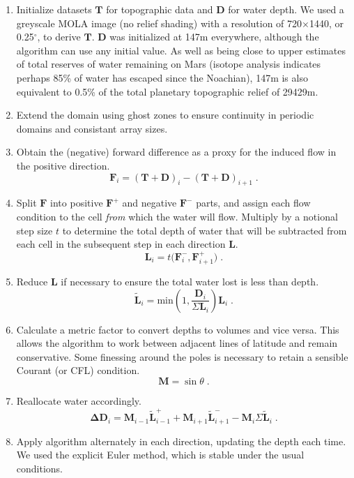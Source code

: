 \documentclass[12pt]{iopart}
\numberwithin{equation}{section}
\begin{document}
\begin{enumerate}
\item Initialize datasets $\mathbf{T}$ for topographic data and $\mathbf{D}$ for water depth. We used a greyscale MOLA image (no relief shading) with a resolution of 720$\times$1440, or 0.25$^\circ$, to derive $\mathbf{T}$. $\mathbf{D}$ was initialized at 147m everywhere, although the algorithm can use any initial value. As well as being close to upper estimates of total reserves of water remaining on Mars (isotope analysis indicates perhaps 85\% of water has escaped since the Noachian\cite{isotopes}), 147m is also equivalent to 0.5\% of the total planetary topographic relief of 29429m.
\item Extend the domain using ghost zones to ensure continuity in periodic domains and consistant array sizes.
\item Obtain the (negative) forward difference as a proxy for the induced flow in the positive direction. 
\[\mathbf{F}_i = (\mathbf{T}+\mathbf{D})_{i}-(\mathbf{T}+\mathbf{D})_{i+1}\;.\]
\item Split $\mathbf{F}$ into positive $\mathbf{F}^+$ and negative $\mathbf{F}^-$ parts, and assign each flow condition to the cell {\it from} which the water will flow. Multiply by a notional step size $t$ to determine the total depth of water that will be subtracted from each cell in the subsequent step in each direction $\mathbf{L}$. 
\[\mathbf{L}_i = t \big(\mathbf{F}^-_i ,\mathbf{F}^+_{i+1} \big)\;.\]
\item Reduce $\mathbf{L}$ if necessary to ensure the total water lost is less than depth.
\[\tilde{\mathbf{L}}_i = \mathrm{min}(1,\frac{\mathbf{D}_i}{\Sigma \mathbf{L}_i})\mathbf{L}_i \;.\]
\item Calculate a metric factor to convert depths to volumes and vice versa. This allows the algorithm to work between adjacent lines of latitude and remain conservative. Some finessing around the poles is necessary to retain a sensible Courant (or CFL) condition\cite{CFL}.
\[\mathbf{M} = \sin \theta\;.\]
\item Reallocate water accordingly.
\[\mathbf{\Delta D}_i = \mathbf{M}_{i-1} \tilde{\mathbf{L}}^+_{i-1} + \mathbf{M}_{i+1} \tilde{\mathbf{L}}^-_{i+1} - \mathbf{M}_i \Sigma \tilde{\mathbf{L}}_i\;.\]
\item Apply algorithm alternately in each direction, updating the depth each time. We used the explicit Euler method, which is stable under the usual conditions.
\end{enumerate}
\end{document}
